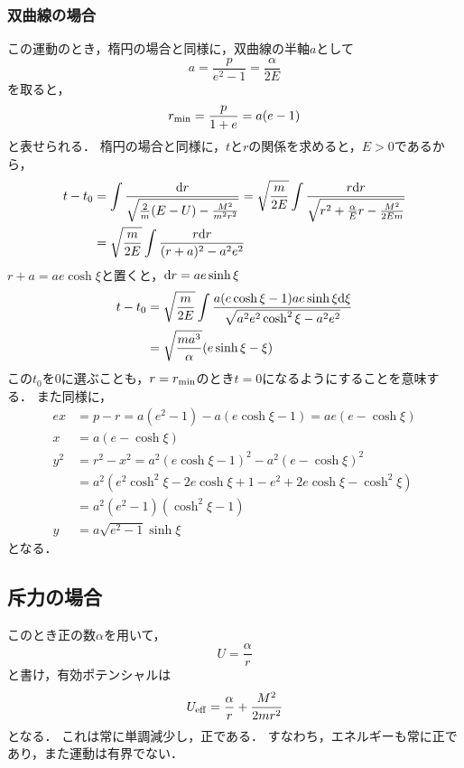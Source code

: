 \documentclass[12pt]{jsarticle}
\begin{document}
	\subsubsection{双曲線の場合}
	この運動のとき，楕円の場合と同様に，双曲線の半軸$a$として
	\[
	a = \frac{p}{e^2-1} = \frac{\alpha}{2E}
	\]
	を取ると，
	\[
	r_{\rm min} = \frac{p}{1+e} = a(e-1)
	\]
	と表せられる．
	楕円の場合と同様に，$t$と$r$の関係を求めると，$E>0$であるから，
	\begin{align*}
	t-t_0 &= \int \frac{{\rm d}r}{\sqrt{\frac{2}{m}(E-U)-\frac{M^2}{m^2r^2}}}
	= \sqrt{\frac{m}{2E}} \int
	\frac{r{\rm d}r}{\sqrt{r^2 + \frac{\alpha}{E}r - \frac{M^2}{2Em}}} \\
	&= \sqrt{\frac{m}{2E}} \int \frac{r{\rm d}r}{(r+a)^2-a^2e^2} \\
	\end{align*}
	$r+a=ae\cosh{\xi}$と置くと，${\rm d}r = ae\sinh{\xi}$
	\begin{align*}
	t-t_0 &= \sqrt{\frac{m}{2E}} \int 
	\frac{a(e\cosh{\xi}-1)ae\sinh{\xi}{\rm d}\xi}{\sqrt{a^2e^2\cosh^2{\xi}-a^2e^2}} \\
	&= \sqrt{\frac{ma^3}{\alpha}}(e\sinh{\xi}-\xi)
	\end{align*}
	この$t_0$を$0$に選ぶことも，$r=r_{\rm min}$のとき$t=0$になるようにすることを意味する．
	また同様に，
	\begin{align*}
	ex &= p - r = a(e^2-1) - a(e\cosh{\xi}-1) = ae(e - \cosh{\xi}) \\
	x &= a(e-\cosh{\xi}) \\
	y^2 &= r^2 - x^2 = a^2(e\cosh{\xi}-1)^2 - a^2(e-\cosh{\xi})^2 \\
	&= a^2(e^2\cosh^2{\xi}-2e\cosh{\xi}+1-e^2+2e\cosh{\xi}-\cosh^2{\xi}) \\
	&= a^2(e^2-1)(\cosh^2{\xi} - 1) \\
	y &= a\sqrt{e^2-1}\sinh{\xi}
	\end{align*}
	となる．
	
	\subsection{斥力の場合}
	このとき正の数$\alpha$を用いて，
	\[
	U = \frac{\alpha}{r}
	\]
	と書け，有効ポテンシャルは
	\[
	U_{\rm eff} = \frac{\alpha}{r} + \frac{M^2}{2mr^2}
	\]
	となる．
	これは常に単調減少し，正である．
	すなわち，エネルギーも常に正であり，また運動は有界でない．
	
\end{document}
